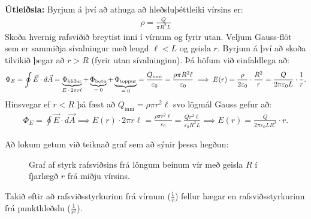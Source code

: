 \ifdefined \wholebook \else\documentclass[oneside]{book}\usepackage{EdlBook}\graphicspath{{figures/}}
\begin{document}
\textbf{Útleiðsla:} Byrjum á því að athuga að hleðsluþéttleiki vírsins er:
\begin{align*}
    \rho = \frac{Q}{\pi R^2 L}
\end{align*}
Skoða hvernig rafsviðið breytist inni í vírnum og fyrir utan. Veljum Gauss-flöt sem er sammiðja sívalningur með lengd $\ell < L$ og geisla $r$. Byrjum á því að skoða tilvikið þegar að $r > R$ (fyrir utan sívalninginn). Þá höfum við einfaldlega að:
\begin{align*}
    \Phi_{E} = \oint \vec{E} \cdot d\vec{A} = \underbrace{\Phi_{\text{hliðar}}}_\textrm{$E \cdot 2\pi r \ell$} + \underbrace{\Phi_{\text{botn}}}_\textrm{$= 0$} + \underbrace{\Phi_{\text{toppur}}}_\textrm{$= 0$} = \frac{Q_{\text{inni}}}{\varepsilon_0} = \frac{\rho \pi R^2 \ell}{\varepsilon_0} \implies E(r) = \frac{\rho}{2\varepsilon_0} \cdot \frac{R^2}{r} = \frac{Q}{2\pi \varepsilon_0 L} \cdot \frac{1}{r}.
\end{align*}
Hinsvegar ef $r < R$ þá fæst að $Q_{\text{inni}} = \rho \pi r^2 \ell$ svo lögmál Gauss gefur að:
\begin{align*}
    \Phi_{E} = \oint \vec{E} \cdot d\vec{A} \implies E(r) \cdot 2\pi r \ell = \frac{\rho \pi r^2 \ell}{\varepsilon_0} = \frac{Q r^2 \ell}{\varepsilon_0 R^2 L} \implies E(r) = \frac{Q}{2\pi \varepsilon_0 L R^2} \cdot r.
\end{align*}

Að lokum getum við teiknað graf sem að sýnir þessa hegðun:


\begin{figure}[H]
    \centering
    \caption{Graf af styrk rafsviðsins frá löngum beinum vír með geisla $R$ í fjarlægð $r$ frá miðju vírsins.}
\end{figure}
Takið eftir að rafsviðsstyrkurinn frá vírnum ($\frac{1}{r}$) fellur hægar en rafsviðsstyrkurinn frá punkthleðslu ($ \frac{1}{r^2}$).
\end{document}
